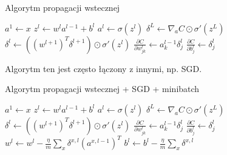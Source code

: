 \documentclass[10pt, oneside]{article}
\theoremstyle{remark}
\begin{document}
\begin{algorithm}
    \caption{Algorytm propagacji wstecznej}
    \label{alg:backprop}
    \begin{algorithmic}[1] %
            \State $a^1 \gets x$ 
            		\State $z^{l} \gets w^l a^{l-1}+b^l$
            		\State $a^{l} \gets \sigma(z^{l})$
            	\EndFor
            	\State $\delta^{L} \gets \nabla_a C \odot \sigma'(z^L)$
            		\State $\delta^{l} \gets ((w^{l+1})^T \delta^{l+1}) \odot \sigma'(z^{l})$         
            	\EndFor
            	\State $\frac{\partial C}{\partial w^l_{jk}} \gets a^{l-1}_k \delta^l_j$
            	\State $\frac{\partial C}{\partial b^l_j} \gets \delta^l_j$
        \EndFunction
    \end{algorithmic}
\end{algorithm}

Algorytm ten jest często łączony z innymi, np. SGD.

\begin{algorithm}
    \caption{Algorytm propagacji wstecznej + SGD + minibatch}
    \label{alg:backprop_sgf}
    \begin{algorithmic}[1] %
	            \State $a^1 \gets x$ 
	            		\State $z^{l} \gets w^l a^{l-1}+b^l$
	            		\State $a^{l} \gets \sigma(z^{l})$
	            	\EndFor
	            	\State $\delta^{L} \gets \nabla_a C \odot \sigma'(z^L)$
	            		\State $\delta^{l} \gets ((w^{l+1})^T \delta^{l+1}) \odot \sigma'(z^{l})$         
	            	\EndFor
	            	\State $\frac{\partial C}{\partial w^l_{jk}} \gets a^{l-1}_k \delta^l_j$
	            	\State $\frac{\partial C}{\partial b^l_j} \gets \delta^l_j$
	         \EndFor
	         	\State $w^l \gets w^l-\frac{\eta}{m} \sum_x \delta^{x,l} (a^{x,l-1})^T$
	         	\State $b^l \gets b^l-\frac{\eta}{m}
  \sum_x \delta^{x,l}$
	         \EndFor
        \EndFunction
    \end{algorithmic}
\end{algorithm}
\end{document}
